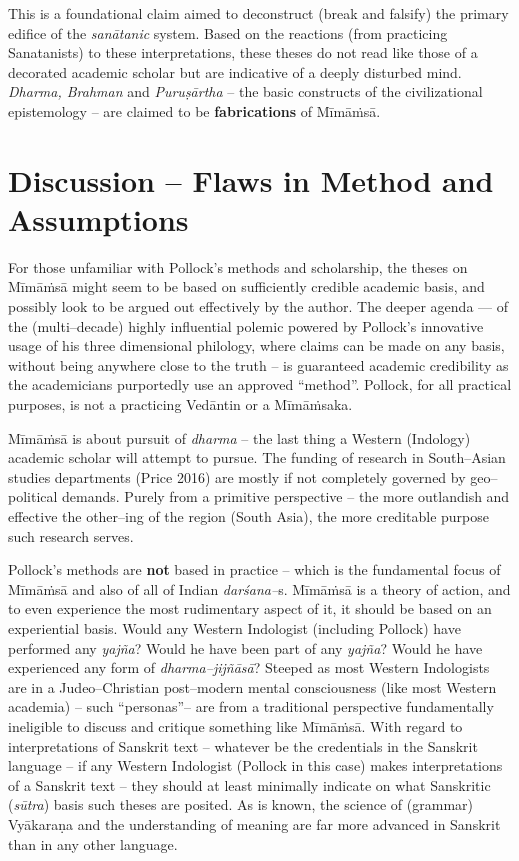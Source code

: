 This is a foundational claim aimed to deconstruct (break and falsify) the primary edifice of the \textit{sanātanic} system. Based on the reactions (from practicing Sanatanists) to these interpretations, these theses do not read like those of a decorated academic scholar but are indicative of a deeply disturbed mind. \textit{Dharma, Brahman} and \textit{Puruṣārtha} – the basic constructs of the civilizational epistemology – are claimed to be \textbf{fabrications} of Mīmāṁsā.


\section*{Discussion – Flaws in Method and Assumptions}

For those unfamiliar with Pollock’s methods and scholarship, the theses on Mīmāṁsā might seem to be based on sufficiently credible academic basis, and possibly look to be argued out effectively by the author. The deeper agenda — of the (multi–decade) highly influential polemic powered by Pollock’s innovative usage of his three dimensional philology, where claims can be made on any basis, without being anywhere close to the truth – is guaranteed academic credibility as the academicians purportedly use an approved “method”. Pollock, for all practical purposes, is not a practicing Vedāntin or a Mīmāṁsaka.

Mīmāṁsā is about pursuit of \textit{dharma} – the last thing a Western (Indology) academic scholar will attempt to pursue. The funding of research in South–Asian studies departments (Price 2016) are mostly if not completely governed by geo–political demands. Purely from a primitive perspective – the more outlandish and effective the other–ing of the region (South Asia), the more creditable purpose such research serves.

Pollock’s methods are \textbf{not} based in practice – which is the fundamental focus of Mīmāṁsā and also of all of Indian \textit{darśana–}s. Mīmāṁsā is a theory of action, and to even experience the most rudimentary aspect of it, it should be based on an experiential basis. Would any Western Indologist (including Pollock) have performed any \textit{yajña}? Would he have been part of any \textit{yajña}? Would he have experienced any form of \textit{dharma–jijñāsā}? Steeped as most Western Indologists are in a Judeo–Christian post–modern mental consciousness (like most Western academia) – such “personas”– are from a traditional perspective fundamentally ineligible to discuss and critique something like Mīmāṁsā. With regard to interpretations of Sanskrit text – whatever be the credentials in the Sanskrit language – if any Western Indologist (Pollock in this case) makes interpretations of a Sanskrit text – they should at least minimally indicate on what Sanskritic (\textit{sūtra}) basis such theses are posited. As is known, the science of (grammar) Vyākaraṇa and the understanding of meaning are far more advanced in Sanskrit than in any other language.

